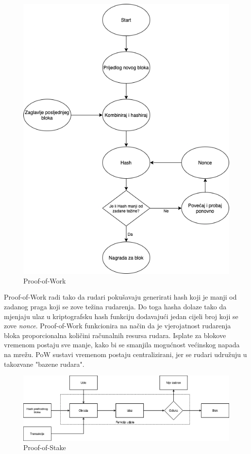 \documentclass[times, utf8, diplomski]{fer}
\begin{document}
\begin{figure}[htb]
\centering
\includegraphics[width=12cm]{imgs/PoW.png}
\caption{Proof-of-Work}
\label{fig:pow}
\end{figure}

Proof-of-Work radi tako da rudari pokušavaju generirati hash koji je manji od zadanog praga koji se zove težina rudarenja. Do toga hasha dolaze tako da mjenjaju ulaz u kriptografsku hash funkciju dodavajući jedan cijeli broj koji se zove \textit{nonce}.  Proof-of-Work funkcionira na način da je vjerojatnost rudarenja bloka proporcionalna količini računalnih resursa rudara. Isplate za blokove vremenom postaju sve manje, kako bi se smanjila mogućnost većinskog napada na mrežu. PoW sustavi vremenom postaju centralizirani, jer se rudari udružuju u takozvane "bazene rudara".

\begin{figure}[htb]
\centering
\includegraphics[width=12cm]{imgs/PoS.png}
\caption{Proof-of-Stake}
\label{fig:pos}
\end{figure}
\end{document}
